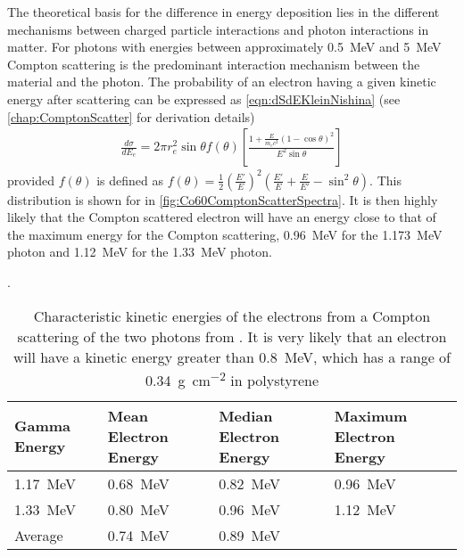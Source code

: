 
The theoretical basis for the difference in energy deposition lies in the different mechanisms between charged particle interactions and photon interactions in matter.
For photons with energies between approximately \SI{0.5}{\MeV} and \SI{5}{\MeV} Compton scattering is the predominant interaction mechanism between the material and the photon.
The probability of an electron having a given kinetic energy after scattering can be expressed as \eqref{eqn:dSdEKleinNishina} (see \autoref{chap:ComptonScatter} for derivation details)
\begin{align}
  \label{eqn:dSdEKleinNishina}
\frac{d\sigma}{dE_e} = 2\pi r_e^2 \sin \theta f(\theta)\left [ \frac{1+\frac{E}{m_e c^2}\left(1-\cos\theta \right)^2}{E^2 \sin \theta} \right ]
\end{align}
provided  $f(\theta)$ is defined as $f(\theta) = \frac{1}{2}\left(\frac{E'}{E}\right)^2 \left(\frac{E'}{E} + \frac{E}{E'}-\sin^2\theta\right)$.
This distribution is shown for  in \autoref{fig:Co60ComptonScatterSpectra}.
It is then highly likely that the Compton scattered electron will have an energy close to that of the maximum energy for the Compton scattering, \SI{0.96}{\MeV} for the \SI{1.173}{\MeV} photon and \SI{1.12}{\MeV} for the \SI{1.33}{\MeV} photon.
\begin{table}
	\caption[Characteristic Energies of Compton Scattered Electrons from Co-60]{Characteristic kinetic energies of the electrons from a Compton scattering of the two photons from . It is very likely that an electron will have a kinetic energy greater than \SI{0.8}{\MeV}, which has a range of \SI{0.34}{\gram\per\cm\squared} in polystyrene}.
	\label{tab:ComptonEnergiesCo60}
	\begin{tabular}{ m{4cm} m{3cm} m{3cm} m{3cm}}
	\toprule
	Gamma Energy & Mean Electron Energy & Median Electron Energy & Maximum Electron Energy \\
	\midrule
	\SI{1.17}{\MeV} & \SI{0.68}{\MeV} & \SI{0.82}{\MeV} & \SI{0.96}{\MeV} \\
	\SI{1.33}{\MeV} & \SI{0.80}{\MeV} & \SI{0.96}{\MeV} & \SI{1.12}{\MeV} \\
	Average & \SI{0.74}{\MeV} & \SI{0.89}{\MeV} &  \\
	\bottomrule
	\end{tabular}
\end{table}
